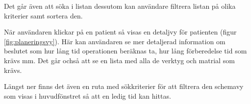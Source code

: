 Det går även att söka i listan dessutom kan användare filtrera listan på olika kriterier samt sortera den.

När användaren klickar på en patient så visas en detaljvy för patienten (figur \ref{fig:planeringsvy}). Här kan användaren se mer detaljerad information om beslutet som hur lång tid operationen beräknas ta, hur lång förberedelse tid som krävs mm. Det går ochså att se en lista med alla de verktyg och matrial som krävs.

Längst ner finns det även en ruta med sökkriterier för att filtrera den schemavy som visas i huvudfönstret så att en ledig tid kan hittas.

\begin{figure}[H]
	\centering

	\begin{subfigure}[b]{0.4\linewidth}

\end{subfigure}
\end{figure}
